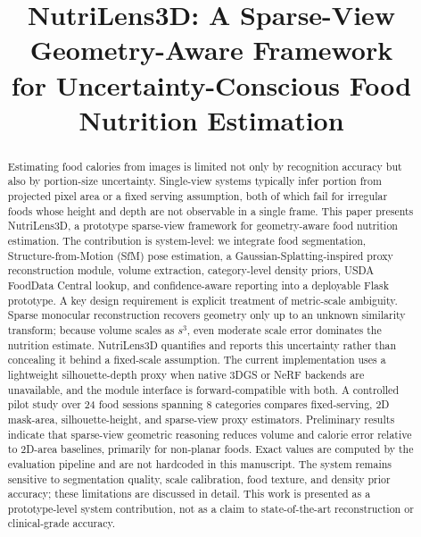\documentclass[conference]{IEEEtran}
\begin{document}
\title{NutriLens3D: A Sparse-View Geometry-Aware Framework\\for Uncertainty-Conscious Food Nutrition Estimation}

\author{
}

\maketitle

\begin{abstract}
Estimating food calories from images is limited not only by recognition accuracy but
also by portion-size uncertainty. Single-view systems typically infer portion from
projected pixel area or a fixed serving assumption, both of which fail for
irregular foods whose height and depth are not observable in a single frame.
This paper presents NutriLens3D, a prototype sparse-view framework for
geometry-aware food nutrition estimation. The contribution is system-level: we
integrate food segmentation, Structure-from-Motion (SfM) pose estimation, a
Gaussian-Splatting-inspired proxy reconstruction module, volume extraction,
category-level density priors, USDA FoodData Central lookup, and
confidence-aware reporting into a deployable Flask prototype.
A key design requirement is explicit treatment of metric-scale ambiguity.
Sparse monocular reconstruction recovers geometry only up to an unknown
similarity transform; because volume scales as $s^3$, even moderate scale error
dominates the nutrition estimate. NutriLens3D quantifies and reports this
uncertainty rather than concealing it behind a fixed-scale assumption.
The current implementation uses a lightweight silhouette-depth proxy when
native 3DGS or NeRF backends are unavailable, and the module interface is
forward-compatible with both.
A controlled pilot study over 24 food sessions spanning 8 categories compares
fixed-serving, 2D mask-area, silhouette-height, and sparse-view proxy estimators.
Preliminary results indicate that sparse-view geometric reasoning reduces volume
and calorie error relative to 2D-area baselines, primarily for non-planar foods.
Exact values are computed by the evaluation pipeline and are not hardcoded in
this manuscript. The system remains sensitive
to segmentation quality, scale calibration, food texture, and density prior
accuracy; these limitations are discussed in detail. This work is presented as a
prototype-level system contribution, not as a claim to state-of-the-art
reconstruction or clinical-grade accuracy.
\end{abstract}
\end{document}
